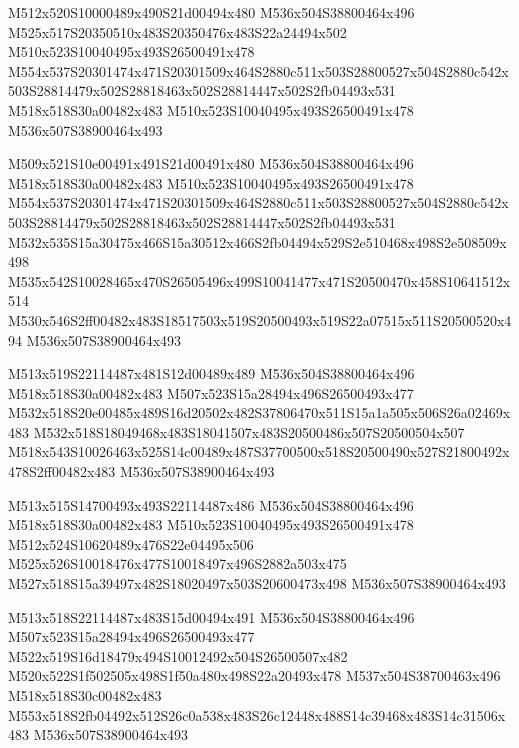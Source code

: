 \documentclass{article}
\begin{document}
\begin{multicols}{5}
\begin{center}

M512x520S10000489x490S21d00494x480 %
M536x504S38800464x496 %
M525x517S20350510x483S20350476x483S22a24494x502 %
M510x523S10040495x493S26500491x478 %
M554x537S20301474x471S20301509x464S2880c511x503S28800527x504S2880c542x503S28814479x502S28818463x502S28814447x502S2fb04493x531 %
M518x518S30a00482x483 %
M510x523S10040495x493S26500491x478 %
M536x507S38900464x493 %
\vfil
\columnbreak

M509x521S10e00491x491S21d00491x480 %
M536x504S38800464x496 %
M518x518S30a00482x483 %
M510x523S10040495x493S26500491x478 %
M554x537S20301474x471S20301509x464S2880c511x503S28800527x504S2880c542x503S28814479x502S28818463x502S28814447x502S2fb04493x531 %
M532x535S15a30475x466S15a30512x466S2fb04494x529S2e510468x498S2e508509x498 %
M535x542S10028465x470S26505496x499S10041477x471S20500470x458S10641512x514 %
M530x546S2ff00482x483S18517503x519S20500493x519S22a07515x511S20500520x494 %
M536x507S38900464x493 %
\vfil
\columnbreak

M513x519S22114487x481S12d00489x489 %
M536x504S38800464x496 %
M518x518S30a00482x483 %
M507x523S15a28494x496S26500493x477 %
M532x518S20e00485x489S16d20502x482S37806470x511S15a1a505x506S26a02469x483 %
M532x518S18049468x483S18041507x483S20500486x507S20500504x507 %
M518x543S10026463x525S14c00489x487S37700500x518S20500490x527S21800492x478S2ff00482x483 %
M536x507S38900464x493 %
\vfil
\columnbreak

M513x515S14700493x493S22114487x486 %
M536x504S38800464x496 %
M518x518S30a00482x483 %
M510x523S10040495x493S26500491x478 %
M512x524S10620489x476S22e04495x506 %
M525x526S10018476x477S10018497x496S2882a503x475 %
M527x518S15a39497x482S18020497x503S20600473x498 %
M536x507S38900464x493 %
\vfil
\columnbreak

M513x518S22114487x483S15d00494x491 %
M536x504S38800464x496 %
M507x523S15a28494x496S26500493x477 %
M522x519S16d18479x494S10012492x504S26500507x482 %
M520x522S1f502505x498S1f50a480x498S22a20493x478 %
M537x504S38700463x496 %
M518x518S30c00482x483 %
M553x518S2fb04492x512S26c0a538x483S26c12448x488S14c39468x483S14c31506x483 %
M536x507S38900464x493 %
\vfil

\end{center}
\end{multicols}
\end{document}
